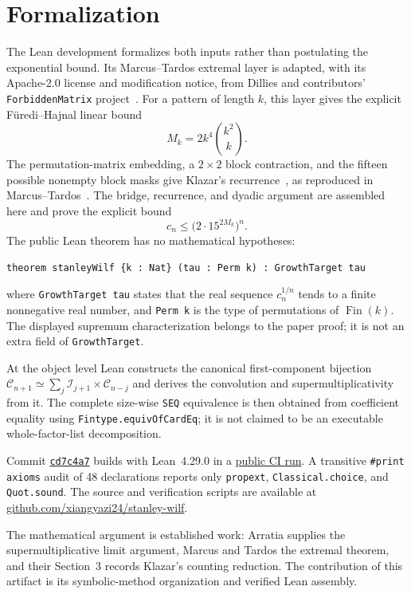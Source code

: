 \documentclass[10pt]{article}
\begin{document}
\section*{Formalization}

The Lean development formalizes both inputs rather than postulating the
exponential bound.  Its Marcus--Tardos extremal layer is adapted, with its
Apache-2.0 license and modification notice, from Dillies and contributors'
\texttt{ForbiddenMatrix} project~\cite{ForbiddenMatrix}.  For a pattern of
length $k$, this layer gives the explicit F\"uredi--Hajnal linear bound
\[
  M_k=2k^4\binom{k^2}{k}.
\]
The permutation-matrix embedding, a $2\times2$ block contraction, and the
fifteen possible nonempty block masks give Klazar's
recurrence~\cite{Klazar}, as reproduced in
Marcus--Tardos~\cite[Section~3]{MarcusTardos}.  The bridge, recurrence, and
dyadic argument are assembled here and prove the explicit bound
\[
  c_n\leq\bigl(2\cdot15^{2M_k}\bigr)^n.
\]
The public Lean theorem has no mathematical hypotheses:
\begin{verbatim}
theorem stanleyWilf {k : Nat} (tau : Perm k) : GrowthTarget tau
\end{verbatim}
where \texttt{GrowthTarget tau} states that the real sequence
$c_n^{1/n}$ tends to a finite nonnegative real number, and
\texttt{Perm k} is the type of permutations of $\operatorname{Fin}(k)$.
The displayed supremum characterization belongs to the paper proof; it is not
an extra field of \texttt{GrowthTarget}.

At the object level Lean constructs the canonical first-component bijection
$\mathcal C_{n+1}\simeq\sum_j\mathcal I_{j+1}\times\mathcal C_{n-j}$ and
derives the convolution and supermultiplicativity from it.  The complete
size-wise \texttt{SEQ} equivalence is then obtained from coefficient equality
using \texttt{Fintype.equivOfCardEq}; it is not claimed to be an executable
whole-factor-list decomposition.

Commit
\href{https://github.com/xiangyazi24/stanley-wilf/commit/cd7c4a735f8d4959aa8e9cbe4eb8c300d4b63c20}
{\texttt{cd7c4a7}} builds with Lean~4.29.0 in a
\href{https://github.com/xiangyazi24/stanley-wilf/actions/runs/34187990454}
{public CI run}.  A transitive
\texttt{\#print axioms} audit of 48 declarations reports only
\texttt{propext}, \texttt{Classical.choice}, and \texttt{Quot.sound}.
The source and verification scripts are available at
\href{https://github.com/xiangyazi24/stanley-wilf}
{github.com/xiangyazi24/stanley-wilf}.

The mathematical argument is established work: Arratia supplies the
supermultiplicative limit argument, Marcus and Tardos the extremal theorem,
and their Section~3 records Klazar's counting reduction.  The contribution of
this artifact is its symbolic-method organization and verified Lean assembly.
\end{document}
